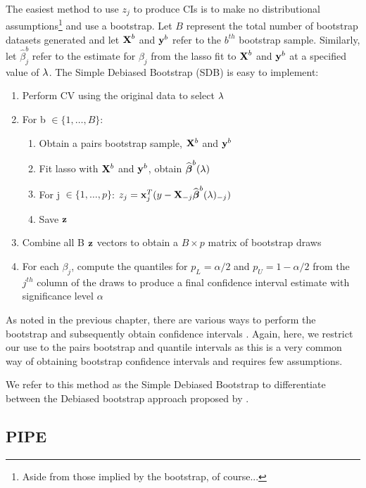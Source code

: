 The easiest method to use $z_j$ to produce CIs is to make no distributional assumptions\footnote{Aside from those implied by the bootstrap, of course...} and use a bootstrap. Let $B$ represent the total number of bootstrap datasets generated and let $\boldsymbol{\mathbf{X}}^b$ and $\boldsymbol{\mathbf{y}}^{b}$ refer to the $b^{th}$ bootstrap sample. Similarly, let $\hat{\beta}^b_j$ refer to the estimate for $\beta_j$ from the lasso fit to $\boldsymbol{\mathbf{X}}^b$ and $\boldsymbol{\mathbf{y}}^b$ at a specified value of $\lambda$. The Simple Debiased Bootstrap (SDB) is easy to implement:

\begin{enumerate}
\item Perform CV using the original data to select $\lambda$
\item For b $\in \lbrace 1, \ldots, B \rbrace$:
\begin{enumerate}
\item Obtain a pairs bootstrap sample, $\mathbf{X}^b$ and $\mathbf{y}^b$
\item Fit lasso with $\mathbf{X}^b$ and $\mathbf{y}^b$, obtain $\widehat{\boldsymbol{\beta}}^b(\lambda)$
\item For j $\in \lbrace 1, \ldots, p \rbrace$:
    $z_j = \mathbf{x}_j^T(y - \mathbf{X}_{-j}\widehat{\boldsymbol{\beta}}^b(\lambda)_{-j})$
\item Save $\mathbf{z}$
\end{enumerate}
\item Combine all B $\mathbf{z}$ vectors to obtain a $B \times p$ matrix of bootstrap draws
\item For each $\beta_j$, compute the quantiles for $p_L = \alpha/2$ and $p_U = 1 - \alpha/2$ from the $j^{th}$ column of the draws to produce a final confidence interval estimate with significance level $\alpha$
\end{enumerate}

As noted in the previous chapter, there are various ways to perform the bootstrap and subsequently obtain confidence intervals \citep{Efron1994}. Again, here, we restrict our use to the pairs bootstrap and quantile intervals as this is a very common way of obtaining bootstrap confidence intervals and requires few assumptions.

We refer to this method as the Simple Debiased Bootstrap to differentiate between the Debiased bootstrap approach proposed by \citep{Dezeure2017}.

\subsection{PIPE}

